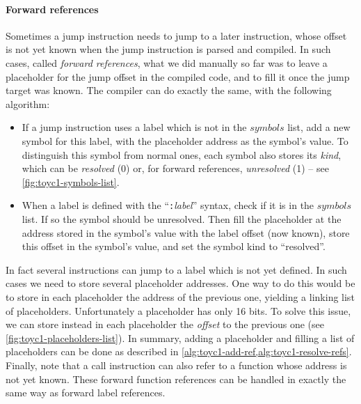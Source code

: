 \bigskip \paragraph*{Forward references} Sometimes a jump instruction needs to
jump to a later instruction, whose offset is not yet known when the jump
instruction is parsed and compiled. In such cases, called {\em forward
references}, what we did manually so far was to leave a placeholder for the
jump offset in the compiled code, and to fill it once the jump target was
known. The compiler can do exactly the same, with the following algorithm:
\begin{itemize}
  \item If a jump instruction uses a label which is not in the $symbols$ list,
  add a new symbol for this label, with the placeholder address as the symbol's
  value. To distinguish this symbol from normal ones, each symbol also stores
  its {\em kind}, which can be {\em resolved} (0) or, for forward references,
  {\em unresolved} (1) -- see \cref{fig:toyc1-symbols-list}.

  \item When a label is defined with the ``{\tt :}{\em label}'' syntax, check
  if it is in the $symbols$ list. If so the symbol should be unresolved. Then
  fill the placeholder at the address stored in the symbol's value with the
  label offset (now known), store this offset in the symbol's value, and set
  the symbol kind to ``resolved''.
\end{itemize}

In fact several instructions can jump to a label which is not yet defined. In
such cases we need to store several placeholder addresses. One way to do this
would be to store in each placeholder the address of the previous one, yielding
a linking list of placeholders. Unfortunately a placeholder has only 16 bits.
To solve this issue, we can store instead in each placeholder the {\em offset}
to the previous one (see \cref{fig:toyc1-placeholders-list}). In summary,
adding a placeholder and filling a list of placeholders can be done as
described in \cref{alg:toyc1-add-ref,alg:toyc1-resolve-refs}. Finally, note
that a call instruction can also refer to a function whose address is not yet
known. These forward function references can be handled in exactly the same way
as forward label references.


